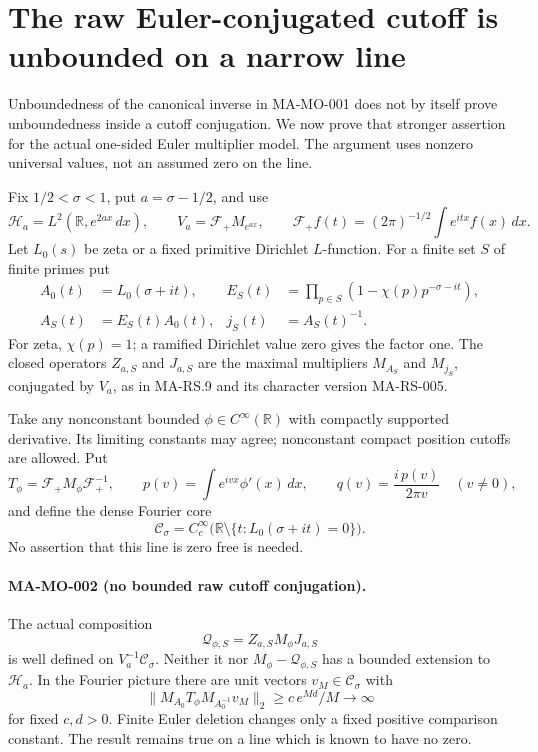 \section{The raw Euler-conjugated cutoff is unbounded on a narrow line}
\label{sec:euler-cutoff-obstruction}

Unboundedness of the canonical inverse in MA-MO-001 does not
by itself prove unboundedness inside a cutoff conjugation.
We now prove that stronger assertion for the actual one-sided
Euler multiplier model. The argument uses nonzero universal
values, not an assumed zero on the line.

Fix \(1/2<\sigma<1\), put \(a=\sigma-1/2\), and use
\[
 \mathcal H_a=L^2(\mathbb R,e^{2ax}\,dx),\qquad
 V_a=\mathcal F_+M_{e^{ax}},\qquad
 \mathcal F_+f(t)=(2\pi)^{-1/2}\int e^{itx}f(x)\,dx.
 \tag{MA-MO.20}
\]
Let \(L_0(s)\) be zeta or a fixed primitive Dirichlet
\(L\)-function. For a finite set \(S\) of finite primes put
\[
 \begin{aligned}
 A_0(t)&=L_0(\sigma+it),&
 E_S(t)&=\prod_{p\in S}(1-\chi(p)p^{-\sigma-it}),\\
 A_S(t)&=E_S(t)A_0(t),&
 j_S(t)&=A_S(t)^{-1}.
 \end{aligned}
 \tag{MA-MO.21}
\]
For zeta, \(\chi(p)=1\); a ramified Dirichlet value zero
gives the factor one. The closed operators \(Z_{a,S}\)
and \(J_{a,S}\) are the maximal multipliers \(M_{A_S}\)
and \(M_{j_S}\), conjugated by \(V_a\), as in MA-RS.9
and its character version MA-RS-005.

Take any nonconstant bounded \(\phi\in C^\infty(\mathbb R)\)
with compactly supported derivative. Its limiting constants
may agree; nonconstant compact position cutoffs are allowed.
Put
\[
 T_\phi=\mathcal F_+M_\phi\mathcal F_+^{-1},\qquad
 p(v)=\int e^{ivx}\phi'(x)\,dx,\qquad
 q(v)=\frac{i\,p(v)}{2\pi v}\quad(v\ne0),
 \tag{MA-MO.22}
\]
and define the dense Fourier core
\[
 \mathscr C_\sigma=C_c^\infty
    \bigl(\mathbb R\setminus\{t:L_0(\sigma+it)=0\}\bigr).
 \tag{MA-MO.23}
\]
No assertion that this line is zero free is needed.

\paragraph{MA-MO-002 (no bounded raw cutoff conjugation).}
The actual composition
\[
                    \mathcal Q_{\phi,S}
                         =Z_{a,S}M_\phi J_{a,S}
 \tag{MA-MO.24}
\]
is well defined on \(V_a^{-1}\mathscr C_\sigma\).
Neither it nor \(M_\phi-\mathcal Q_{\phi,S}\) has a
bounded extension to \(\mathcal H_a\).
In the Fourier picture there are unit vectors
\(v_M\in\mathscr C_\sigma\) with
\[
 \|M_{A_0}T_\phi M_{A_0^{-1}}v_M\|_2
                         \ge c\,e^{Md}/M\longrightarrow\infty
 \tag{MA-MO.25}
\]
for fixed \(c,d>0\). Finite Euler deletion changes only
a fixed positive comparison constant. The result remains
true on a line which is known to have no zero.

